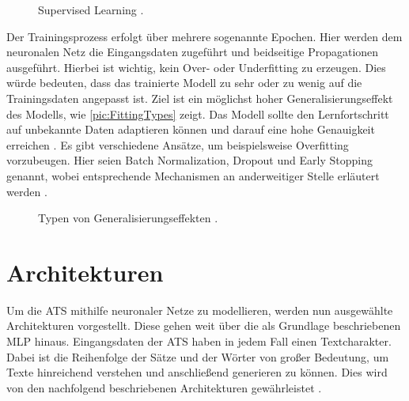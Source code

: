 \begin{figure}[h!]
  \centering
  \caption{Supervised Learning \cite[S.~3]{RAS19}.}
  \label{pic:SupervisedLearning}
\end{figure}

\noindent
Der Trainingsprozess erfolgt über mehrere sogenannte Epochen. Hier werden dem neuronalen Netz die Eingangsdaten zugeführt und beidseitige Propagationen ausgeführt. Hierbei ist wichtig, kein Over- oder Underfitting zu erzeugen. Dies würde bedeuten, dass das trainierte Modell zu sehr oder zu wenig auf die Trainingsdaten angepasst ist. Ziel ist ein möglichst hoher Generalisierungseffekt des Modells, wie \autoref{pic:FittingTypes} zeigt. Das Modell sollte den Lernfortschritt auf unbekannte Daten adaptieren können und darauf eine hohe Genauigkeit erreichen \cite[S.~108-110]{GOO16}. Es gibt verschiedene Ansätze, um beispielsweise Overfitting vorzubeugen. Hier seien Batch Normalization, Dropout und Early Stopping genannt, wobei entsprechende Mechanismen an anderweitiger Stelle erläutert werden \cite[S.~241,~255,~276,~313]{GOO16}.\\

\begin{figure}[h!]
  \centering
  \caption{Typen von Generalisierungseffekten \cite{EDPOJ}.}
  \label{pic:FittingTypes}
\end{figure}


\section{Architekturen}
\noindent
Um die \ac{ATS} mithilfe neuronaler Netze zu modellieren, werden nun ausgewählte Architekturen vorgestellt. Diese gehen weit über die als Grundlage beschriebenen \ac{MLP} hinaus. Eingangsdaten der \ac{ATS} haben in jedem Fall einen Textcharakter. Dabei ist die Reihenfolge der Sätze und der Wörter von großer Bedeutung, um Texte hinreichend verstehen und anschließend generieren zu können. Dies wird von den nachfolgend beschriebenen Architekturen gewährleistet \cite[S.~301]{ZHA20}.


